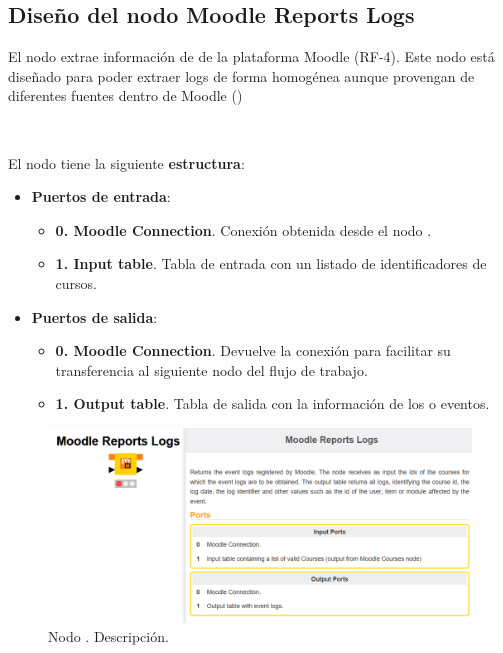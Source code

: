 \newpage
\subsection{Diseño del nodo Moodle Reports Logs}

El nodo  extrae información de  de la plataforma Moodle (RF-4). 
Este nodo está diseñado para poder extraer logs de forma homogénea aunque provengan de diferentes
fuentes dentro de Moodle ()

\

El nodo tiene la siguiente \textbf{estructura}:

\begin{itemize}
	\item \textbf{Puertos de entrada}: 
    \begin{itemize}
		\item \textbf{0. Moodle Connection}. Conexión obtenida desde el nodo . 
		\item \textbf{1. Input table}. Tabla de entrada con un listado de identificadores de cursos. 
   	\end{itemize}

	\item \textbf{Puertos de salida}: 
    \begin{itemize}
		\item \textbf{0. Moodle Connection}. Devuelve la conexión para facilitar su transferencia al siguiente nodo del flujo de trabajo. 
		\item \textbf{1. Output table}. Tabla de salida con la información de los  o eventos. 
   	\end{itemize}

\end{itemize}

\begin{figure}[!h]
	\centering
	\includegraphics[width=1\textwidth]{img/nodes_moodle_reports_logs.png}
	\caption{Nodo . Descripción.}
	\label{fig:moodlereportslogs}
\end{figure}
\FloatBarrier

